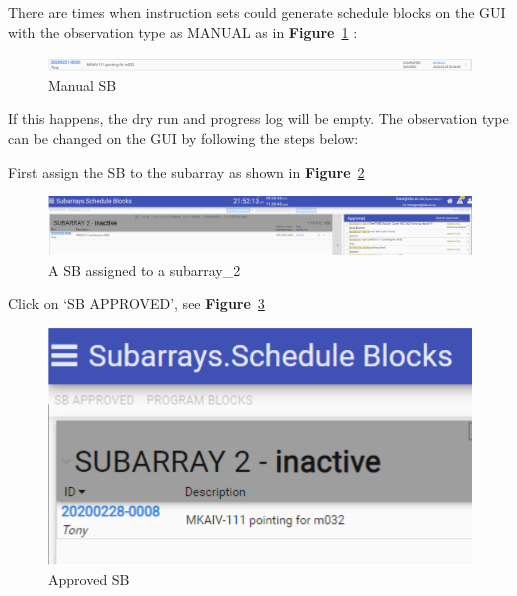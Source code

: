 There are times when instruction sets could generate schedule blocks on the GUI with the observation type as MANUAL as in  \textbf{Figure}~\ref{fig:image19} :


\begin{figure}[!thb]
	\centering
	\includegraphics[scale=0.25]{Chapters/images/image19.png}
	
	\caption{Manual SB}
	\label{fig:image19}
\end{figure}

If this happens, the dry run and progress log will be empty. The observation type can be changed on the GUI by following the steps below:

First assign the SB to the subarray as shown in  \textbf{Figure}~\ref{fig:image131}


\begin{figure}[!thb]
	\centering
	\includegraphics[scale=0.25]{Chapters/images/image131.png}
	
	\caption{A SB assigned  to a subarray\_2}
	\label{fig:image131}
\end{figure}

Click on ‘SB APPROVED’, see  \textbf{Figure}~\ref{fig:image119}


\begin{figure}[!thb]
	\centering
	\includegraphics[scale=0.25]{Chapters/images/image119.png}
	 
	\caption{Approved SB}
	\label{fig:image119}
\end{figure}

